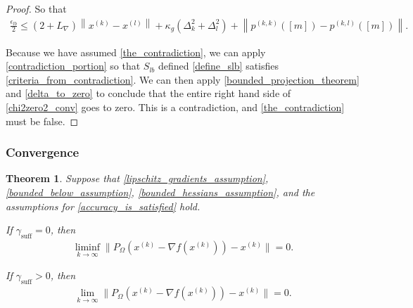 \documentclass{article}
\newtheorem{theorem}{Theorem}[section]
\theoremstyle{case}
\numberwithin{theorem}{subsection}
\newcommand{\dk}{\Delta_k}
\newcommand{\dl}{\Delta_l}
\newcommand{\gammabi}{\gamma_{\textrm{suff}}}
\newcommand{\gradf}{\nabla f}
\newcommand{\lipgrad}{{L_{\nabla}}}
\newcommand{\xk}{x^{(k)}}
\newcommand{\xl}{{x^{(l)}}}
\newcommand{\projkl}{{p^{(k,l)}}}
\newcommand{\projkk}{{p^{(k,k)}}}
\begin{document}
\begin{proof}
So that
\begin{align}
\frac{\epsilon_{lb}} 2 \le \left(2 + \lipgrad\right) \left\|\xk - \xl\right\| 
+ \kappa_g \left(\dk^2 + \dl^2\right)
+ \left\|\projkk\left([m]\right) - \projkl\left([m]\right)\right\|
\label{chi2zero2_conv}.
\end{align}

Because we have assumed \cref{the_contradiction}, we can apply \cref{contradiction_portion} so that 
$S_{lb}$ defined \cref{define_slb} satisfies \cref{criteria_from_contradiction}.
We can then apply \cref{bounded_projection_theorem} and \cref{delta_to_zero} to conclude that the entire right hand side of \cref{chi2zero2_conv} goes to zero.
This is a contradiction, and \cref{the_contradiction} must be false.
\end{proof}

\subsubsection{Convergence}

\begin{theorem}
\label{the_convergence_theorem}
Suppose that \cref{lipschitz_gradients_assumption}, \cref{bounded_below_assumption}, \cref{bounded_hessians_assumption}, and 
the assumptions for \cref{accuracy_is_satisfied} hold.

If $\gammabi = 0$, then
\begin{align}
\liminf_{k\to\infty} \|P_{\Omega}(\xk - \gradf(\xk)) - \xk \| = 0.
\end{align}

If $\gammabi > 0$, then
\begin{align}
\lim_{k\to\infty} \|P_{\Omega}(\xk - \gradf(\xk)) - \xk \| = 0.
\end{align}

\end{theorem}
\end{document}
